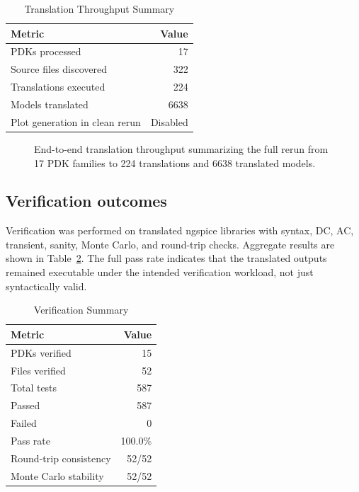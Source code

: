 \documentclass[10pt,twocolumn,a4paper]{article}
\begin{document}
\begin{table}[t]
\caption{Translation Throughput Summary}
\label{tab:throughput}
\centering
\begin{tabular}{@{}lr@{}}
\toprule
Metric & Value \\
\midrule
PDKs processed & 17 \\
Source files discovered & 322 \\
Translations executed & 224 \\
Models translated & 6638 \\
Plot generation in clean rerun & Disabled \\
\bottomrule
\end{tabular}
\end{table}

\begin{figure}[t]
\centering
{}
\caption{End-to-end translation throughput summarizing the full rerun from 17 PDK families to 224 translations and 6638 translated models.}
\label{fig:throughput}
\end{figure}

\subsection{Verification outcomes}
Verification was performed on translated ngspice libraries with syntax, DC, AC, transient, sanity, Monte Carlo, and round-trip checks. Aggregate results are shown in Table~\ref{tab:verification_summary}. The full pass rate indicates that the translated outputs remained executable under the intended verification workload, not just syntactically valid.

\begin{table}[t]
\caption{Verification Summary}
\label{tab:verification_summary}
\centering
\begin{tabular}{@{}lr@{}}
\toprule
Metric & Value \\
\midrule
PDKs verified & 15 \\
Files verified & 52 \\
Total tests & 587 \\
Passed & 587 \\
Failed & 0 \\
Pass rate & 100.0\% \\
Round-trip consistency & 52/52 \\
Monte Carlo stability & 52/52 \\
\bottomrule
\end{tabular}
\end{table}
\end{document}
